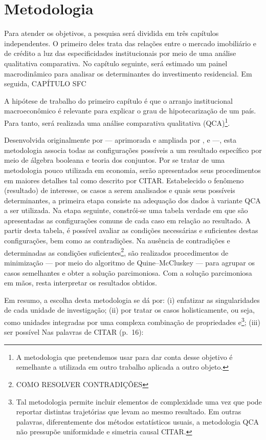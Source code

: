 \section{Metodologia}\label{passos}


Para atender os objetivos, a pesquisa será dividida em três capítulos independentes.
O primeiro deles trata das relações entre o mercado imobiliário e de crédito a luz das especificidades institucionais por meio de uma análise qualitativa comparativa.
No capítulo seguinte, será estimado um painel macrodinâmico para analisar os determinantes do investimento residencial.
Em seguida, CAPÍTULO SFC
 
 
A hipótese de trabalho do primeiro capítulo é que o arranjo institucional macroeconômico é relevante para explicar o grau de hipotecarização de um país.
Para tanto, será realizada uma  análise comparativa qualitativa (QCA)\footnote{A metodologia que pretendemos usar para dar conta desse objetivo é semelhante a utilizada em outro trabalho \cite{petrini_comparacao_2019} aplicada a outro objeto.}. 


Desenvolvida originalmente por \textcite{ragin_comparative_1989} ---  aprimorada e ampliada por \textcite{ragin_set_2006}, \textcite{box-steffensmeier_measurement_2009} e \textcite{smithson_fuzzy_2006} ---, esta metodologia associa todas as configurações possíveis a um resultado específico por meio de álgebra booleana e teoria dos conjuntos.
Por se tratar de uma metodologia pouco utilizada em economia, serão apresentados seus procedimentos em maiores detalhes tal como descrito por CITAR.
Estabelecido o fenômeno (resultado) de interesse, os casos a serem analisados e quais seus possíveis determinantes, a primeira etapa  consiste na adequação dos dados à variante QCA a ser utilizada.
Na etapa seguinte, constrói-se uma tabela verdade em que são apresentadas as configurações comuns de cada caso em relação ao resultado.
A partir desta tabela, é possível avaliar as condições necessárias e suficientes destas configurações, bem como as contradições.
Na ausência de contradições e determinadas as condições suficientes\footnote{COMO RESOLVER CONTRADIÇÕES}, são realizados procedimentos de minimização --- por meio do algoritmo de Quine–McCluskey \cite{ragin_comparative_1989} --- para agrupar os casos semelhantes e obter a solução parcimoniosa.
Com a solução parcimoniosa em mãos, resta interpretar os resultados obtidos.

Em resumo, a escolha desta metodologia se dá por: 
	(i) enfatizar as singularidades de cada unidade de investigação; 
	(ii) por tratar os casos holisticamente, ou seja, como unidades integradas por uma complexa combinação de propriedades e\footnote{Tal metodologia permite incluir elementos de complexidade uma vez que pode reportar distintas trajetórias que levam ao mesmo resultado. Em outras palavras, diferentemente dos métodos estatísticos usuais, a metodologia QCA não pressupõe uniformidade  e simetria causal CITAR.}; 
	(iii) ser possível 
Nas palavras de CITAR (p.~16):

